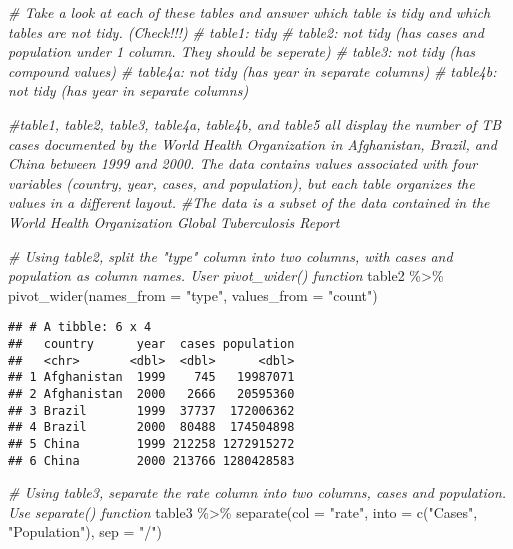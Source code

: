 \documentclass[
]{article}
\newenvironment{Shaded}{\begin{snugshade}}{\end{snugshade}}
\newcommand{\AttributeTok}[1]{\textcolor[rgb]{0.77,0.63,0.00}{#1}}
\newcommand{\CommentTok}[1]{\textcolor[rgb]{0.56,0.35,0.01}{\textit{#1}}}
\newcommand{\FunctionTok}[1]{\textcolor[rgb]{0.00,0.00,0.00}{#1}}
\newcommand{\NormalTok}[1]{#1}
\newcommand{\SpecialCharTok}[1]{\textcolor[rgb]{0.00,0.00,0.00}{#1}}
\newcommand{\StringTok}[1]{\textcolor[rgb]{0.31,0.60,0.02}{#1}}
\begin{document}
\begin{Shaded}
\begin{Highlighting}[]
\CommentTok{\# Take a look at each of these tables and answer which table is tidy and which tables are not tidy. (Check!!!)}
\CommentTok{\# table1: tidy }
\CommentTok{\# table2: not tidy (has cases and population under 1 column. They should be seperate)}
\CommentTok{\# table3: not tidy (has compound values)}
\CommentTok{\# table4a: not tidy (has year in separate columns)}
\CommentTok{\# table4b: not tidy (has year in separate columns)}

\CommentTok{\#\textquotesingle{}table1, table2, table3, table4a, table4b, and table5 all display the number of  TB cases documented by the World Health Organization in Afghanistan, Brazil, and China between 1999 and 2000. The data contains values associated with four variables (country, year, cases, and population), but each table organizes the values in a different layout. }
\CommentTok{\#\textquotesingle{}The data is a subset of the data contained in the World Health Organization Global Tuberculosis Report}
\end{Highlighting}
\end{Shaded}

\begin{Shaded}
\begin{Highlighting}[]
\CommentTok{\# Using table2, split the "type" column into two columns, with cases and population as column names. User pivot\_wider() function  }
\NormalTok{table2 }\SpecialCharTok{\%\textgreater{}\%}
\FunctionTok{pivot\_wider}\NormalTok{(}\AttributeTok{names\_from =} \StringTok{"type"}\NormalTok{,}
             \AttributeTok{values\_from =} \StringTok{"count"}\NormalTok{)}
\end{Highlighting}
\end{Shaded}

\begin{verbatim}
## # A tibble: 6 x 4
##   country      year  cases population
##   <chr>       <dbl>  <dbl>      <dbl>
## 1 Afghanistan  1999    745   19987071
## 2 Afghanistan  2000   2666   20595360
## 3 Brazil       1999  37737  172006362
## 4 Brazil       2000  80488  174504898
## 5 China        1999 212258 1272915272
## 6 China        2000 213766 1280428583
\end{verbatim}

\begin{Shaded}
\begin{Highlighting}[]
\CommentTok{\# Using table3, separate the rate column into two columns, cases and population. Use separate() function }
\NormalTok{table3 }\SpecialCharTok{\%\textgreater{}\%}
  \FunctionTok{separate}\NormalTok{(}\AttributeTok{col =} \StringTok{"rate"}\NormalTok{,}
           \AttributeTok{into =} \FunctionTok{c}\NormalTok{(}\StringTok{"Cases"}\NormalTok{, }\StringTok{"Population"}\NormalTok{),}
           \AttributeTok{sep =} \StringTok{"/"}\NormalTok{)}
\end{Highlighting}
\end{Shaded}
\end{document}
